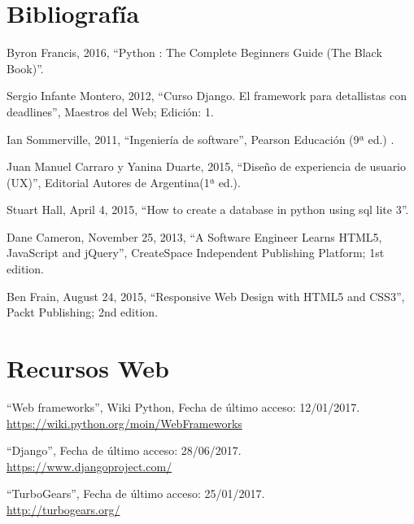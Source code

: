 \section{Bibliografía}




Byron Francis, 2016, ``Python : The Complete Beginners Guide (The Black Book)''. 


Sergio Infante Montero, 2012, ``Curso Django. El framework para detallistas con deadlines'', Maestros del Web; Edición: 1.

Ian Sommerville, 2011, ``Ingeniería de software'', Pearson Educación (9ª ed.) .

  Juan Manuel Carraro y Yanina Duarte, 2015, ``Diseño de experiencia de usuario (UX)'', Editorial Autores de Argentina(1ª ed.).


  Stuart Hall, April 4, 2015, ``How to create a database in python using sql lite 3''.

  Dane Cameron, November 25, 2013, ``A Software Engineer Learns HTML5, JavaScript and jQuery'', CreateSpace Independent Publishing Platform; 1st edition.

  Ben Frain, August 24, 2015, ``Responsive Web Design with HTML5 and CSS3'', Packt Publishing; 2nd edition.







\section{Recursos Web}

``Web frameworks'', Wiki Python, Fecha de último acceso: 12/01/2017.\\\href{https://wiki.python.org/moin/WebFrameworks}{https://wiki.python.org/moin/WebFrameworks}

``Django'', Fecha de último acceso: 28/06/2017.\\\href{https://www.djangoproject.com/}{https://www.djangoproject.com/}

``TurboGears'', Fecha de último acceso: 25/01/2017.\\\href{http://turbogears.org/}{http://turbogears.org/}


